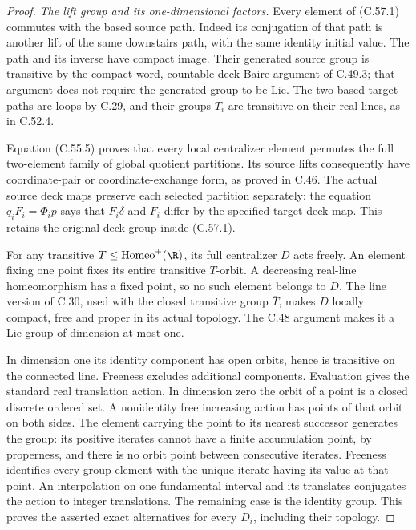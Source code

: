 \begin{proof}
\emph{The lift group and its one-dimensional factors.}
Every element of (C.57.1) commutes with the based
source path. Indeed its conjugation of that path
is another lift of the same downstairs path,
with the same identity initial value.
The path and its inverse have compact image.
Their generated source group is transitive by
the compact-word, countable-deck Baire argument
of C.49.3; that argument does not require the
generated group to be Lie.
The two based target paths are loops by C.29,
and their groups $T_i$ are transitive on their
real lines, as in C.52.4.

Equation (C.55.5) proves that every local
centralizer element permutes the full two-element
family of global quotient partitions.
Its source lifts consequently have coordinate-pair
or coordinate-exchange form, as proved in C.46.
The actual source deck maps preserve each selected
partition separately: the equation
$q_iF_i=\Phi_i p$ says that $F_i\delta$ and $F_i$
differ by the specified target deck map.
This retains the original deck group inside
(C.57.1).

For any transitive $T\leq\operatorname{Homeo}^+(\R)$,
its full centralizer $D$ acts freely. An element
fixing one point fixes its entire transitive
$T$-orbit. A decreasing real-line homeomorphism
has a fixed point, so no such element belongs
to $D$. The line version of C.30, used with
the closed transitive group $\overline T$,
makes $D$ locally compact, free and proper
in its actual topology.
The C.48 argument makes it a Lie group
of dimension at most one.

In dimension one its identity component
has open orbits, hence is transitive on
the connected line. Freeness excludes
additional components. Evaluation gives
the standard real translation action.
In dimension zero the orbit of a point
is a closed discrete ordered set.
A nonidentity free increasing action
has points of that orbit on both sides.
The element carrying the point to its
nearest successor generates the group:
its positive iterates cannot have a
finite accumulation point, by properness,
and there is no orbit point between
consecutive iterates. Freeness identifies
every group element with the unique
iterate having its value at that point.
An interpolation on one fundamental
interval and its translates conjugates
the action to integer translations.
The remaining case is the identity group.
This proves the asserted exact alternatives
for every $D_i$, including their topology.


\end{proof}
